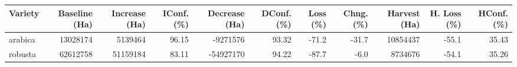 \begin{table}[ht]
\centering
\begin{tabular}{lrrrrrrrrrr}
  \hline
Variety & Baseline (Ha) & Increase (Ha) & IConf. (\%) & Decrease (Ha) & DConf. (\%) & Loss (\%) & Chng. (\%) & Harvest (Ha) & H. Loss (\%) & HConf. (\%) \\ 
  \hline
arabica & 13028174 & 5139464 & 96.15 & -9271576 & 93.32 & -71.2 & -31.7 & 10854437 & -55.1 & 35.43 \\ 
  robusta & 62612758 & 51159184 & 83.11 & -54927170 & 94.22 & -87.7 & -6.0 & 8734676 & -54.1 & 35.26 \\ 
   \hline
\end{tabular}
\end{table}
